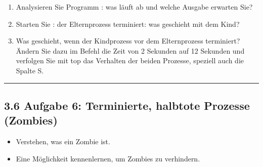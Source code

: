 \documentclass[a4paper,10pt,english]{report}
\begin{document}
\sphinxAtStartPar
{}
\begin{enumerate}
%
\item {} 
\sphinxAtStartPar
Analysieren Sie Programm : was läuft ab und welche Ausgabe erwarten Sie?

\begin{sphinxVerbatim}[commandchars=\\\{\}]

\end{sphinxVerbatim}

\item {} 
\sphinxAtStartPar
Starten Sie : der Elternprozess terminiert: was geschieht mit dem Kind?

\begin{sphinxVerbatim}[commandchars=\\\{\}]

\end{sphinxVerbatim}

\item {} 
\sphinxAtStartPar
Was geschieht, wenn der Kindprozess vor dem Elternprozess terminiert? Ändern Sie dazu im  Befehl die Zeit von 2 Sekunden auf 12 Sekunden und verfolgen Sie mit top das Verhalten der beiden Prozesse, speziell auch die Spalte S.

\begin{sphinxVerbatim}[commandchars=\\\{\}]

\end{sphinxVerbatim}

\end{enumerate}


\bigskip\hrule\bigskip



\subsection{3.6 Aufgabe 6: Terminierte, halbtote Prozesse (Zombies)}
\label{\detokenize{P07_Prozesse_und_Threads/README:aufgabe-6-terminierte-halbtote-prozesse-zombies}}
\sphinxAtStartPar
{}
\begin{itemize}
\item {} 
\sphinxAtStartPar
Verstehen, was ein Zombie ist.

\item {} 
\sphinxAtStartPar
Eine Möglichkeit kennenlernen, um Zombies zu verhindern.

\end{itemize}
\end{document}

